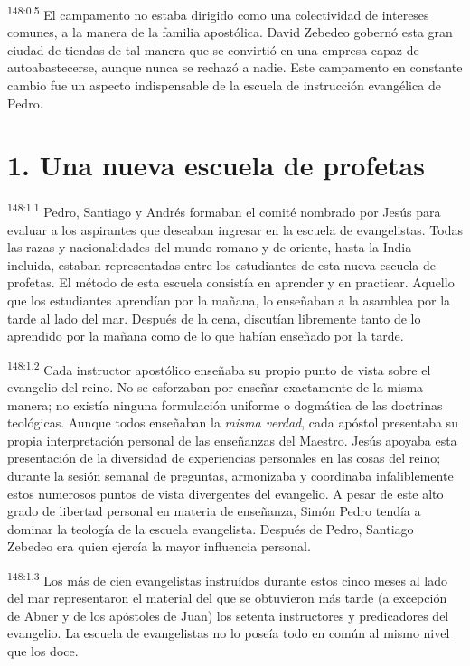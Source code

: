 \par 
\textsuperscript{148:0.5} El campamento no estaba dirigido como una colectividad de intereses comunes, a la manera de la familia apostólica. David Zebedeo gobernó esta gran ciudad de tiendas de tal manera que se convirtió en una empresa capaz de autoabastecerse, aunque nunca se rechazó a nadie. Este campamento en constante cambio fue un aspecto indispensable de la escuela de instrucción evangélica de Pedro.

\section*{1. Una nueva escuela de profetas}
\par 
\textsuperscript{148:1.1} Pedro, Santiago y Andrés formaban el comité nombrado por Jesús para evaluar a los aspirantes que deseaban ingresar en la escuela de evangelistas. Todas las razas y nacionalidades del mundo romano y de oriente, hasta la India incluida, estaban representadas entre los estudiantes de esta nueva escuela de profetas. El método de esta escuela consistía en aprender y en practicar. Aquello que los estudiantes aprendían por la mañana, lo enseñaban a la asamblea por la tarde al lado del mar. Después de la cena, discutían libremente tanto de lo aprendido por la mañana como de lo que habían enseñado por la tarde.

\par 
\textsuperscript{148:1.2} Cada instructor apostólico enseñaba su propio punto de vista sobre el evangelio del reino. No se esforzaban por enseñar exactamente de la misma manera; no existía ninguna formulación uniforme o dogmática de las doctrinas teológicas. Aunque todos enseñaban la \textit{misma verdad}, cada apóstol presentaba su propia interpretación personal de las enseñanzas del Maestro. Jesús apoyaba esta presentación de la diversidad de experiencias personales en las cosas del reino; durante la sesión semanal de preguntas, armonizaba y coordinaba infaliblemente estos numerosos puntos de vista divergentes del evangelio. A pesar de este alto grado de libertad personal en materia de enseñanza, Simón Pedro tendía a dominar la teología de la escuela evangelista. Después de Pedro, Santiago Zebedeo era quien ejercía la mayor influencia personal.

\par 
\textsuperscript{148:1.3} Los más de cien evangelistas instruídos durante estos cinco meses al lado del mar representaron el material del que se obtuvieron más tarde (a excepción de Abner y de los apóstoles de Juan) los setenta instructores y predicadores del evangelio. La escuela de evangelistas no lo poseía todo en común al mismo nivel que los doce.

